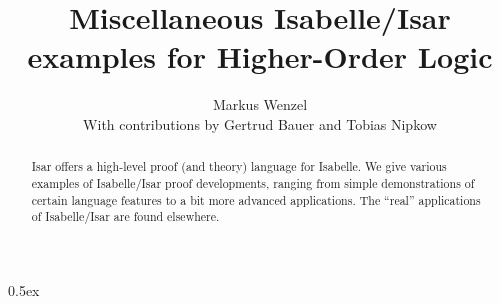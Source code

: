 \documentclass[11pt,a4paper]{article}
\begin{document}
\title{Miscellaneous Isabelle/Isar examples for Higher-Order Logic}
\author{Markus Wenzel \\[2ex]
  With contributions by Gertrud Bauer and Tobias Nipkow}
\maketitle

\begin{abstract}
  Isar offers a high-level proof (and theory) language for Isabelle.
  We give various examples of Isabelle/Isar proof developments,
  ranging from simple demonstrations of certain language features to a
  bit more advanced applications.  The ``real'' applications of
  Isabelle/Isar are found elsewhere.
\end{abstract}

\tableofcontents

\parindent 0pt \parskip 0.5ex



\nocite{isabelle-isar-ref,Wenzel:1999:TPHOL}


\end{document}
